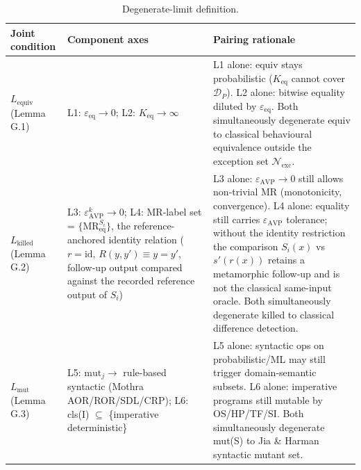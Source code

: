 \documentclass[review,12pt,authoryear]{elsarticle}
\begin{document}
{\def\LTcaptype{table} %
\begin{longtable}[]{@{}
  >{\raggedright\arraybackslash}p{}
  >{\raggedright\arraybackslash}p{}
  >{\raggedright\arraybackslash}p{}@{}}
\caption{Degenerate-limit definition.}\label{tab:p2-29}\\
\toprule\noalign{}
\begin{minipage}[b]{\linewidth}\raggedright
Joint condition
\end{minipage} & \begin{minipage}[b]{\linewidth}\raggedright
Component axes
\end{minipage} & \begin{minipage}[b]{\linewidth}\raggedright
Pairing rationale
\end{minipage} \\
\midrule\noalign{}
\endfirsthead
\endhead
\bottomrule\noalign{}
\endlastfoot
\textbf{$L_{\mathrm{equiv}}$} (Lemma G.1) & L1: $\varepsilon_{\mathrm{eq}} \to 0$; L2: $K_{\mathrm{eq}} \to \infty$ & L1 alone:
equiv stays probabilistic ($K_{\mathrm{eq}}$ cannot cover $\mathcal{D}_P$). L2 alone: bitwise
equality diluted by $\varepsilon_{\mathrm{eq}}$. Both simultaneously degenerate equiv to
classical behavioural equivalence outside the exception set
$\mathcal{N}_{\mathrm{exc}}$. \\
\textbf{$L_{\mathrm{killed}}$} (Lemma G.2) & L3: $\varepsilon_{\mathrm{AVP}}^k \to 0$; L4: MR-label set =
$\{\mathrm{MR}_{\mathrm{eq}}^{S_i}\}$, the reference-anchored identity
relation ($r = \mathrm{id}$, $R(y,y') \equiv y = y'$, follow-up output
compared against the recorded reference output of $S_i$) & L3 alone: $\varepsilon_{\mathrm{AVP}} \to 0$ still allows
non-trivial MR (monotonicity, convergence). L4 alone: equality still
carries $\varepsilon_{\mathrm{AVP}}$ tolerance; without the identity
restriction the comparison $S_i(x)$ vs $s'(r(x))$ retains a metamorphic
follow-up and is not the classical same-input oracle. Both simultaneously degenerate killed to
classical difference detection. \\
\textbf{$L_{\mathrm{mut}}$} (Lemma G.3) & L5: $\mathrm{mut}_j \to$ rule-based syntactic (Mothra
AOR/ROR/SDL/CRP); L6: cls(I) $\subseteq$ \{imperative deterministic\} & L5 alone:
syntactic ops on probabilistic/ML may still trigger domain-semantic
subsets. L6 alone: imperative programs still mutable by OS/HP/TF/SI.
Both simultaneously degenerate mut(S) to Jia \& Harman syntactic mutant
set. \\
\end{longtable}
}
\end{document}
